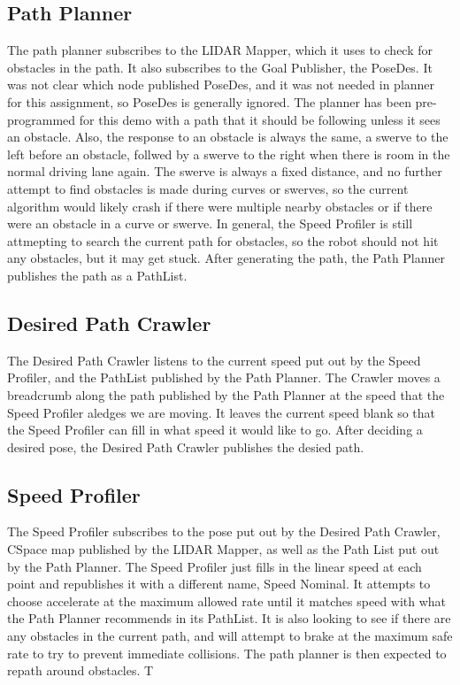 \documentclass{article}
\begin{document}
\subsection{Path Planner}

The path planner subscribes to the LIDAR Mapper, which it uses to check for obstacles in the path. It also subscribes to the Goal Publisher, the PoseDes.  It was not clear which node published PoseDes, and it was not needed in planner for this assignment, so PoseDes is generally ignored.  The planner has been pre-programmed for this demo with a path that it should be following unless it sees an obstacle.  Also, the response to an obstacle is always the same, a swerve to the left before an obstacle, follwed by a swerve to the right when there is room in the normal driving lane again.  The swerve is always a fixed distance, and no further attempt to find obstacles is made during curves or swerves, so the current algorithm would likely crash if there were multiple nearby obstacles or if there were an obstacle in a curve or swerve.  In general, the Speed Profiler is still attmepting to search the current path for obstacles, so the robot should not hit any obstacles, but it may get stuck.  After generating the path, the Path Planner publishes the path as a PathList.

\subsection{Desired Path Crawler}

The Desired Path Crawler listens to the current speed put out by the Speed Profiler, and the PathList published by the Path Planner. The Crawler moves a breadcrumb along the path published by the Path Planner at the speed that the Speed Profiler aledges we are moving.  It leaves the current speed blank so that the Speed Profiler can fill in what speed it would like to go.  After deciding a desired pose, the Desired Path Crawler publishes the desied path.

\subsection{Speed Profiler}

The Speed Profiler subscribes to the pose put out by the Desired Path Crawler, CSpace map published by the LIDAR Mapper, as well as the Path List put out by the Path Planner.  The Speed Profiler just fills in the linear speed at each point and republishes it with a different name, Speed Nominal.  It attempts to choose accelerate at the maximum allowed rate until it matches speed with what the Path Planner recommends in its PathList.  It is also looking to see if there are any obstacles in the current path, and will attempt to brake at the maximum safe rate to try to prevent immediate collisions.  The path planner is then expected to repath around obstacles. T
\end{document}
